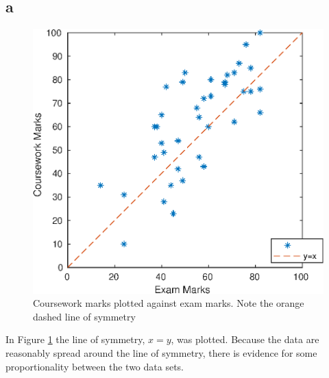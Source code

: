 \subsection{a}
\begin{figure}[h]
	\includegraphics[scale=0.8, center]{./eps/topic1_a.eps}
    \caption{Coursework marks plotted against exam marks. Note the orange dashed line of symmetry}
    \label{fig:Topic1-a}
\end{figure}
In Figure \ref{fig:Topic1-a} the line of symmetry, $x=y$, was plotted.
Because the data are reasonably spread around the line of symmetry, there is evidence for some proportionality between the two data sets.


\pagebreak

